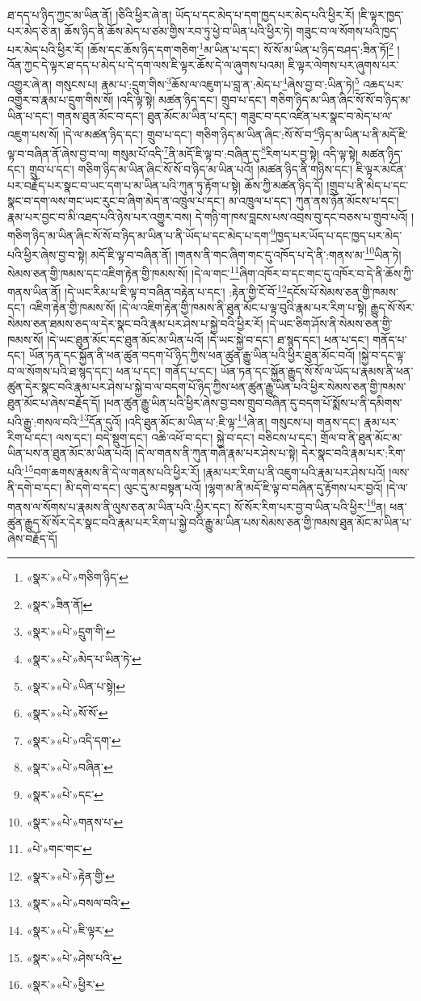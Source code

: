 ཐ་དད་པ་ཉིད་ཀྱང་མ་ཡིན་ནོ། །ཅིའི་ཕྱིར་ཞེ་ན། ཡོད་པ་དང་མེད་པ་དག་ཁྱད་པར་མེད་པའི་ཕྱིར་རོ། །ཇི་ལྟར་ཁྱད་པར་མེད་ཅེ་ན། ཆོས་ཉིད་ནི་ཆོས་མེད་པ་ཙམ་གྱིས་རབ་ཏུ་ཕྱེ་བ་ཡིན་པའི་ཕྱིར་ཏེ། གཟུང་བ་ལ་སོགས་པའི་ཁྱད་པར་མེད་པའི་ཕྱིར་རོ། །ཆོས་དང་ཆོས་ཉིད་དག་གཅིག་\footnote{«སྣར་»«པེ་»གཅིག་ཉིད་}མ་ཡིན་པ་དང་། སོ་སོ་མ་ཡིན་པ་ཉིད་བཤད་:ཟིན་ཏོ།\footnote{«སྣར་»ཟིན་ནོ།} །འོན་ཀྱང་དེ་ལྟར་ཐ་དད་པ་མེད་པ་དེ་དག་ལས་ཇི་ལྟར་ཆོས་དེ་ལ་ཞུགས་པའམ། ཇི་ལྟར་ལེགས་པར་ཞུགས་པར་འགྱུར་ཞེ་ན། གསུངས་པ། རྣམ་པ་:དྲུག་གིས་\footnote{«སྣར་»«པེ་»དྲུག་གི་}ཆོས་ལ་འཇུག་པ་བླ་ན་:མེད་པ་\footnote{«སྣར་»«པེ་»མེད་པ་ཡིན་ཏེ་}ཞེས་བྱ་བ་:ཡིན་ཏེ།\footnote{«སྣར་»«པེ་»ཡིན་པ་སྟེ།} འཆད་པར་འགྱུར་བ་རྣམ་པ་དྲུག་གིས་སོ། །འདི་ལྟ་སྟེ། མཚན་ཉིད་དང་། གྲུབ་པ་དང་། གཅིག་ཉིད་མ་ཡིན་ཞིང་སོ་སོ་བ་ཉིད་མ་ཡིན་པ་དང་། གནས་ཐུན་མོང་བ་དང་། ཐུན་མོང་མ་ཡིན་པ་དང་། གཟུང་བ་དང་འཛིན་པར་སྣང་བ་མེད་པ་ལ་འཇུག་པས་སོ། །དེ་ལ་མཚན་ཉིད་དང་། གྲུབ་པ་དང་། གཅིག་ཉིད་མ་ཡིན་ཞིང་:སོ་སོ་བ་\footnote{«སྣར་»«པེ་»སོ་སོ་}ཉིད་མ་ཡིན་པ་ནི་མདོ་ཇི་ལྟ་བ་བཞིན་ནོ་ཞེས་བྱ་བ་ལ། གསུམ་པོ་འདི་\footnote{«སྣར་»«པེ་»འདི་དག་}ནི་མདོ་ཇི་ལྟ་བ་:བཞིན་དུ་\footnote{«སྣར་»«པེ་»བཞིན་}རིག་པར་བྱ་སྟེ། འདི་ལྟ་སྟེ། མཚན་ཉིད་དང་། གྲུབ་པ་དང་། གཅིག་ཉིད་མ་ཡིན་ཞིང་སོ་སོ་བ་ཉིད་མ་ཡིན་པའོ། །མཚན་ཉིད་ནི་གཉིས་དང་། ཇི་ལྟར་མངོན་པར་བརྗོད་པར་སྣང་བ་ཡང་དག་པ་མ་ཡིན་པའི་ཀུན་ཏུ་རྟོག་པ་སྟེ། ཆོས་ཀྱི་མཚན་ཉིད་དོ། །གྲུབ་པ་ནི་མེད་པ་དང་སྣང་བ་དག་ལས་གང་ཡང་རུང་བ་ཞིག་མེད་ན་འཁྲུལ་པ་དང་། མ་འཁྲུལ་པ་དང་། ཀུན་ནས་ཉོན་མོངས་པ་དང་། རྣམ་པར་བྱང་བ་མི་འཐད་པའི་ཉེས་པར་འགྱུར་བས། དེ་གཉི་ག་ཁས་བླངས་པས་འབྲས་བུ་དང་བཅས་པ་གྲུབ་པའོ། །གཅིག་ཉིད་མ་ཡིན་ཞིང་སོ་སོ་བ་ཉིད་མ་ཡིན་པ་ནི་ཡོད་པ་དང་མེད་པ་དག་\footnote{«སྣར་»«པེ་»དང་}ཁྱད་པར་ཡོད་པ་དང་ཁྱད་པར་མེད་པའི་ཕྱིར་ཞེས་བྱ་བ་སྟེ། མདོ་ཇི་ལྟ་བ་བཞིན་ནོ། །གནས་ནི་གང་ཞིག་གང་དུ་འཁོད་པ་དེ་ནི་:གནས་མ་\footnote{«སྣར་»«པེ་»གནས་པ་}ཡིན་ཏེ། སེམས་ཅན་གྱི་ཁམས་དང་འཇིག་རྟེན་གྱི་ཁམས་སོ། །དེ་ལ་གང་\footnote{«པེ་»གང་གང་}ཞིག་འཁོར་བ་དང་གང་དུ་འཁོར་བ་དེ་ནི་ཆོས་ཀྱི་གནས་ཡིན་ནོ། །དེ་ཡང་རིམ་པ་ཇི་ལྟ་བ་བཞིན་བརྟེན་པ་དང་། :རྟེན་གྱི་ངོ་བོ་\footnote{«སྣར་»«པེ་»རྟེན་གྱི་}དངོས་པོ་སེམས་ཅན་གྱི་ཁམས་དང་། འཇིག་རྟེན་གྱི་ཁམས་སོ། །དེ་ལ་འཇིག་རྟེན་གྱི་ཁམས་ནི་ཐུན་མོང་པ་ལྟ་བུའི་རྣམ་པར་རིག་པ་སྟེ། རྒྱུད་སོ་སོར་སེམས་ཅན་ཐམས་ཅད་ལ་དེར་སྣང་བའི་རྣམ་པར་ཤེས་པ་སྐྱེ་བའི་ཕྱིར་རོ། །དེ་ཡང་ཅིག་ཤོས་ནི་སེམས་ཅན་གྱི་ཁམས་སོ། །དེ་ཡང་ཐུན་མོང་དང་ཐུན་མོང་མ་ཡིན་པའོ། །དེ་ཡང་སྐྱེ་བ་དང་། ཐ་སྙད་དང་། ཕན་པ་དང་། གནོད་པ་དང་། ཡོན་ཏན་དང་སྐྱོན་ནི་ཕན་ཚུན་བདག་པོ་ཉིད་ཀྱིས་ཕན་ཚུན་རྒྱུ་ཡིན་པའི་ཕྱིར་ཐུན་མོང་བའོ། །སྐྱེ་བ་དང་ལྟ་བ་ལ་སོགས་པའི་ཐ་སྙད་དང་། ཕན་པ་དང་། གནོད་པ་དང་། ཡོན་ཏན་དང་སྐྱོན་རྒྱུད་སོ་སོ་ལ་ཡོད་པ་རྣམས་ནི་ཕན་ཚུན་དེར་སྣང་བའི་རྣམ་པར་ཤེས་པ་སྐྱེ་བ་ལ་བདག་པོ་ཉིད་ཀྱིས་ཕན་ཚུན་རྒྱུ་ཡིན་པའི་ཕྱིར་སེམས་ཅན་གྱི་ཁམས་ཐུན་མོང་པ་ཞེས་བརྗོད་དོ། །ཕན་ཚུན་རྒྱུ་ཡིན་པའི་ཕྱིར་ཞེས་བྱ་བས་གྲུབ་བཞིན་དུ་བདག་པོ་སྨོས་པ་ནི་དམིགས་པའི་རྒྱུ་:གསལ་བའི་\footnote{«སྣར་»«པེ་»བསལ་བའི་}དོན་དུའོ། །འདི་ཐུན་མོང་མ་ཡིན་པ་:ཇི་ལྟ་\footnote{«སྣར་»«པེ་»ཇི་ལྟར་}ཞེ་ན། གསུངས་པ། གནས་དང་། རྣམ་པར་རིག་པ་དང་། ལས་དང་། བདེ་སྡུག་དང་། འཆི་འཕོ་བ་དང་། སྐྱེ་བ་དང་། བཅིངས་པ་དང་། གྲོལ་བ་ནི་ཐུན་མོང་མ་ཡིན་པས་ན་ཐུན་མོང་མ་ཡིན་པའོ། །དེ་ལ་གནས་ནི་ཀུན་གཞི་རྣམ་པར་ཤེས་པ་སྟེ། དེར་སྣང་བའི་རྣམ་པར་:རིག་པའི་\footnote{«སྣར་»«པེ་»ཤེས་པའི་}བག་ཆགས་རྣམས་ནི་དེ་ལ་གནས་པའི་ཕྱིར་རོ། །རྣམ་པར་རིག་པ་ནི་འཇུག་པའི་རྣམ་པར་ཤེས་པའོ། །ལས་ནི་དགེ་བ་དང་། མི་དགེ་བ་དང་། ལུང་དུ་མ་བསྟན་པའོ། །ལྷག་མ་ནི་མདོ་ཇི་ལྟ་བ་བཞིན་དུ་རྟོགས་པར་བྱའོ། །དེ་ལ་གནས་ལ་སོགས་པ་རྣམས་ནི་ལུས་ཅན་མ་ཡིན་པའི་:ཕྱིར་དང་། སོ་སོར་རིག་པར་བྱ་བ་ཡིན་པའི་ཕྱིར་\footnote{«སྣར་»«པེ་»ཕྱིར་}ན། ཕན་ཚུན་རྒྱུད་སོ་སོར་དེར་སྣང་བའི་རྣམ་པར་རིག་པ་སྐྱེ་བའི་རྒྱུ་མ་ཡིན་པས་སེམས་ཅན་གྱི་ཁམས་ཐུན་མོང་མ་ཡིན་པ་ཞེས་བརྗོད་དོ། 